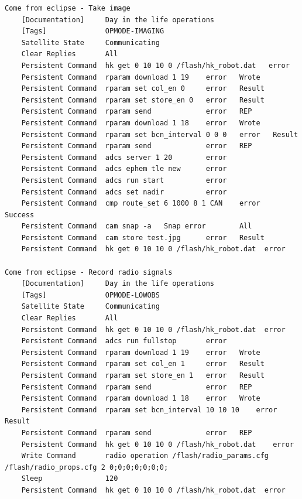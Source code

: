 \documentclass[english,12pt,a4paper,pdftex,elec,utf8]{aaltothesis}
\begin{document}
\begin{verbatim}
Come from eclipse - Take image
    [Documentation]     Day in the life operations
    [Tags]              OPMODE-IMAGING
    Satellite State     Communicating
    Clear Replies       All
    Persistent Command  hk get 0 10 10 0 /flash/hk_robot.dat   error
    Persistent Command  rparam download 1 19    error   Wrote
    Persistent Command  rparam set col_en 0     error   Result
    Persistent Command  rparam set store_en 0   error   Result
    Persistent Command  rparam send             error   REP
    Persistent Command  rparam download 1 18    error   Wrote
    Persistent Command  rparam set bcn_interval 0 0 0   error   Result
    Persistent Command  rparam send             error   REP
    Persistent Command  adcs server 1 20        error
    Persistent Command  adcs ephem tle new      error
    Persistent Command  adcs run start          error
    Persistent Command  adcs set nadir          error
    Persistent Command  cmp route_set 6 1000 8 1 CAN    error   Success
    Persistent Command  cam snap -a   Snap error        All
    Persistent Command  cam store test.jpg      error   Result
    Persistent Command  hk get 0 10 10 0 /flash/hk_robot.dat  error

Come from eclipse - Record radio signals
    [Documentation]     Day in the life operations
    [Tags]              OPMODE-LOWOBS
    Satellite State     Communicating
    Clear Replies       All
    Persistent Command  hk get 0 10 10 0 /flash/hk_robot.dat  error
    Persistent Command  adcs run fullstop       error
    Persistent Command  rparam download 1 19    error   Wrote
    Persistent Command  rparam set col_en 1     error   Result
    Persistent Command  rparam set store_en 1   error   Result
    Persistent Command  rparam send             error   REP
    Persistent Command  rparam download 1 18    error   Wrote
    Persistent Command  rparam set bcn_interval 10 10 10    error   Result
    Persistent Command  rparam send             error   REP
    Persistent Command  hk get 0 10 10 0 /flash/hk_robot.dat    error
    Write Command       radio operation /flash/radio_params.cfg /flash/radio_props.cfg 2 0;0;0;0;0;0;0;
    Sleep               120
    Persistent Command  hk get 0 10 10 0 /flash/hk_robot.dat  error


\end{verbatim}
\end{document}
